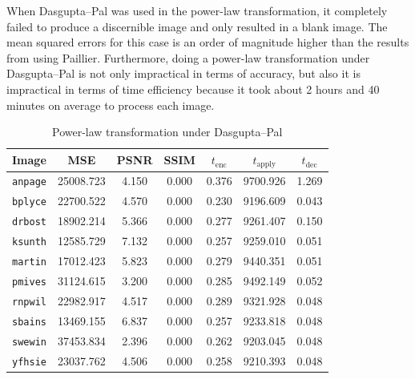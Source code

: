 When Dasgupta--Pal was used in the power-law transformation, it completely failed to produce a discernible image and only resulted in a blank image. The mean squared errors for this case is an order of magnitude higher than the results from using Paillier. Furthermore, doing a power-law transformation under Dasgupta--Pal is not only impractical in terms of accuracy, but also it is impractical in terms of time efficiency because it took about 2 hours and 40 minutes on average to process each image.

\begin{table}[h]
	\centering
	\caption{Power-law transformation under Dasgupta--Pal}
	\label{tbl:pwr-dp}
    \begin{tabular}{lcccccc}
        \toprule
        Image & MSE  & PSNR & SSIM & $t_\text{enc}$ & $t_\text{apply}$ & $t_\text{dec}$ \\ \midrule
		\texttt{anpage} & 25008.723 & 4.150 & 0.000 & 0.376 & 9700.926 & 1.269 \\
		\texttt{bplyce} & 22700.522 & 4.570 & 0.000 & 0.230 & 9196.609 & 0.043 \\
		\texttt{drbost} & 18902.214 & 5.366 & 0.000 & 0.277 & 9261.407 & 0.150 \\
		\texttt{ksunth} & 12585.729 & 7.132 & 0.000 & 0.257 & 9259.010 & 0.051 \\
		\texttt{martin} & 17012.423 & 5.823 & 0.000 & 0.279 & 9440.351 & 0.051 \\
		\texttt{pmives} & 31124.615 & 3.200 & 0.000 & 0.285 & 9492.149 & 0.052 \\
		\texttt{rnpwil} & 22982.917 & 4.517 & 0.000 & 0.289 & 9321.928 & 0.048 \\
		\texttt{sbains} & 13469.155 & 6.837 & 0.000 & 0.257 & 9233.818 & 0.048 \\
		\texttt{swewin} & 37453.834 & 2.396 & 0.000 & 0.262 & 9203.045 & 0.048 \\
		\texttt{yfhsie} & 23037.762 & 4.506 & 0.000 & 0.258 & 9210.393 & 0.048 \\

\end{tabular}
\end{table}
